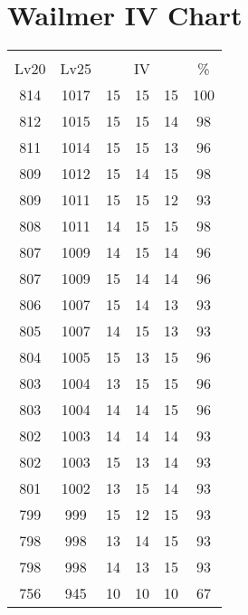 \documentclass{article}%
\begin{document}
%
\normalsize%
\section{Wailmer IV Chart}%
\label{sec:Wailmer IV Chart}%
\renewcommand{\arraystretch}{1.5}%
\begin{tabular}{|c|c|c|c|c|c|}%
\hline%
\multicolumn{6}{|c|}{\textcolor{white}{ 
\linebreak{Wailmer}
}%
\cellcolor{black}}\\%
\multicolumn{1}{|c}{Lv20}&\multicolumn{1}{c|}{Lv25}&\multicolumn{3}{c|}{IV}&\multicolumn{1}{|c|}{\%}\\%
\hline%
\rowcolor{color100}%
814&1017&15&15&15&100\\%
\hline%
\rowcolor{color98}%
812&1015&15&15&14&98\\%
\hline%
\rowcolor{color96}%
811&1014&15&15&13&96\\%
\hline%
\rowcolor{color98}%
809&1012&15&14&15&98\\%
\hline%
\rowcolor{color93}%
809&1011&15&15&12&93\\%
\hline%
\rowcolor{color98}%
808&1011&14&15&15&98\\%
\hline%
\rowcolor{color96}%
807&1009&14&15&14&96\\%
\hline%
\rowcolor{color96}%
807&1009&15&14&14&96\\%
\hline%
\rowcolor{color93}%
806&1007&15&14&13&93\\%
\hline%
\rowcolor{color93}%
805&1007&14&15&13&93\\%
\hline%
\rowcolor{color96}%
804&1005&15&13&15&96\\%
\hline%
\rowcolor{color96}%
803&1004&13&15&15&96\\%
\hline%
\rowcolor{color96}%
803&1004&14&14&15&96\\%
\hline%
\rowcolor{color93}%
802&1003&14&14&14&93\\%
\hline%
\rowcolor{color93}%
802&1003&15&13&14&93\\%
\hline%
\rowcolor{color93}%
801&1002&13&15&14&93\\%
\hline%
\rowcolor{color93}%
799&999&15&12&15&93\\%
\hline%
\rowcolor{color93}%
798&998&13&14&15&93\\%
\hline%
\rowcolor{color93}%
798&998&14&13&15&93\\%
\hline%
\rowcolor{color91}%
756&945&10&10&10&67\\%
\end{tabular}

%
\end{document}
